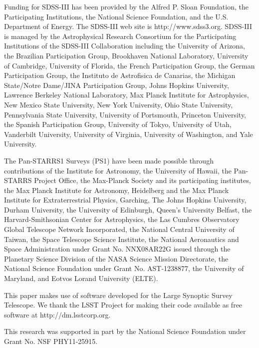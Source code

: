 \documentclass[a4paper,fleqn,usenatbib]{mnras}
\begin{document}
  Funding for SDSS-III has been provided by the Alfred P. Sloan Foundation, the
  Participating Institutions, the National Science Foundation, and the U.S.  Department of
  Energy. The SDSS-III web site is http://www.sdss3.org.  SDSS-III is managed by the
  Astrophysical Research Consortium for the Participating Institutions of the SDSS-III
  Collaboration including the University of Arizona, the Brazilian Participation Group,
  Brookhaven National Laboratory, University of Cambridge, University of Florida, the
  French Participation Group, the German Participation Group, the Instituto de Astrofisica
  de Canarias, the Michigan State/Notre Dame/JINA Participation Group, Johns Hopkins
  University, Lawrence Berkeley National Laboratory, Max Planck Institute for
  Astrophysics, New Mexico State University, New York University, Ohio State University,
  Pennsylvania State University, University of Portsmouth, Princeton University, the
  Spanish Participation Group, University of Tokyo, University of Utah, Vanderbilt
  University, University of Virginia, University of Washington, and Yale University.
  
  The Pan-STARRS1 Surveys (PS1) have been made possible through contributions of the 
  Institute for Astronomy, the University of Hawaii, the Pan-STARRS Project Office, 
  the Max-Planck Society and its participating institutes, the Max Planck Institute 
  for Astronomy, Heidelberg and the Max Planck Institute for Extraterrestrial Physics, 
  Garching, The Johns Hopkins University, Durham University, the University of Edinburgh, 
  Queen's University Belfast, the Harvard-Smithsonian Center for Astrophysics, the Las 
  Cumbres Observatory Global Telescope Network Incorporated, the National Central 
  University of Taiwan, the Space Telescope Science Institute, the National Aeronautics 
  and Space Administration under Grant No. NNX08AR22G issued through the Planetary 
  Science Division of the NASA Science Mission Directorate, the National Science 
  Foundation under Grant No. AST-1238877, the University of Maryland, and Eotvos 
  Lorand University (ELTE).
  
  This paper makes use of software developed for the Large Synoptic Survey 
  Telescope. We thank the LSST Project for making their code available as free 
  software at http://dm.lsstcorp.org.
  
  This research was supported in part by the National Science Foundation under Grant 
  No. NSF PHY11-25915. 
 
\end{document}
